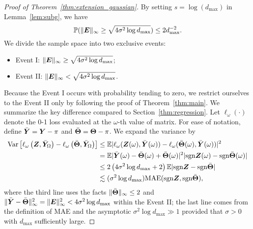 \documentclass[11pt]{article}
\theoremstyle{plain}
\theoremstyle{definition}
\def\sign{\textup{sgn}}
\begin{document}
\begin{proof}[Proof of Theorem~\ref{thm:extension_gaussian}]
By setting $s=\log(d_{\max})$ in Lemma~\ref{lem:subg}, we have
\[
\mathbb{P}(\lVert\bm{E}\rVert_\infty\geq \sqrt{4\sigma^2\log d_{\max}} )\leq 2d_{\max}^{-2}.
\]
We divide the sample space into two exclusive events:
\begin{itemize}
\item Event I: $\lVert\bm{E}\rVert_\infty\geq \sqrt{4\sigma^2\log d_{\max}}$;
\item Event II: $\lVert\bm{E}\rVert_\infty< \sqrt{4\sigma^2\log d_{\max}}$.
\end{itemize}
Because the Event I occurs with probability tending to zero, we restrict ourselves to the Event II only by following the proof of Theorem~\ref{thm:main}.   We summarize the key difference compared to Section~\ref{thm:regression}. Let $\ell_\omega(\cdot)$ denote the 0-1 loss evaluated at the $\omega$-th value of matrix. 
For ease of notation,  define $\bar {\bm Y} = \bm Y-\pi$ and $\bar{\bm{\Theta}} = \bm{\Theta}-\pi$.
We expand the variance by 
\begin{align}
    \label{eq:variance2}
    \text{Var}\left[\ell_\omega\left(\mZ,\bar \mY_\Omega\right)-\ell_\omega\left(\bar\mTheta,\bar\mY_\Omega\right)\right]&\leq \mathbb{E}|\ell_\omega(\mZ(\omega),\bar\mY(\omega))-\ell_\omega(\bar\mTheta(\omega),\bar\mY(\omega))|^2\notag \\
    &= \mathbb{E}|\bar \mY(\omega)-\bar \mTheta(\omega)+\bar\mTheta(\omega)|^2|\text{sgn}\mZ(\omega)-\text{sgn}\bar\mTheta(\omega)| \notag \\
    &\leq 2\left(4 \sigma^2\log d_{\max}+2\right) \mathbb{E}|\text{sgn}\mZ-\text{sgn}\bar\mTheta| \notag \\
    & \lesssim (\sigma^2 \log d_{\max}) \text{MAE}(\sign \mZ, \sign \bar \mTheta),
    \end{align}
where the third line uses the facts $\lVert\bar {\bm{\Theta}}\rVert_\infty\leq 2$ and $\lVert\bar {\bm Y}-\bar {\bm{\Theta}}\rVert_\infty^2=\lVert\bm{E}\rVert_\infty^2<4 \sigma^2\log d_{\max}$ within the Event II; the last line comes from the definition of MAE and the asymptotic $\sigma^2\log d_{\max}\gg 1$ provided that $\sigma>0$ with $d_{\max}$ sufficiently large. 


\end{proof}
\end{document}
